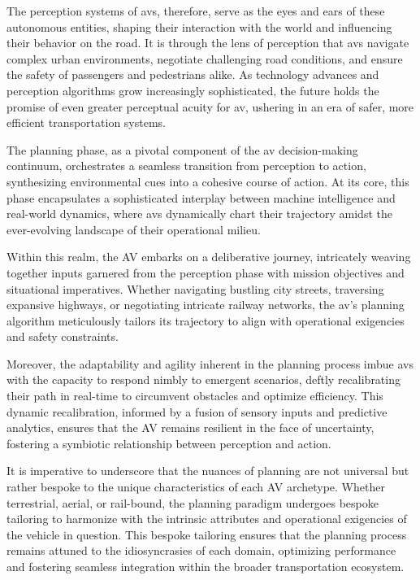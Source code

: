 The perception systems of \glspl{av}, therefore, serve as the eyes and ears of these autonomous entities, shaping their interaction with the world and influencing their behavior on the road. It is through the lens of perception that \glspl{av} navigate complex urban environments, negotiate challenging road conditions, and ensure the safety of passengers and pedestrians alike. As technology advances and perception algorithms grow increasingly sophisticated, the future holds the promise of even greater perceptual acuity for \gls{av}, ushering in an era of safer, more efficient transportation systems.

The planning phase, as a pivotal component of the \gls{av} decision-making continuum, orchestrates a seamless transition from perception to action, synthesizing environmental cues into a cohesive course of action. At its core, this phase encapsulates a sophisticated interplay between machine intelligence and real-world dynamics, where \glspl{av} dynamically chart their trajectory amidst the ever-evolving landscape of their operational milieu.

Within this realm, the AV embarks on a deliberative journey, intricately weaving together inputs garnered from the perception phase with mission objectives and situational imperatives. Whether navigating bustling city streets, traversing expansive highways, or negotiating intricate railway networks, the \gls{av}'s planning algorithm meticulously tailors its trajectory to align with operational exigencies and safety constraints.

Moreover, the adaptability and agility inherent in the planning process imbue \glspl{av} with the capacity to respond nimbly to emergent scenarios, deftly recalibrating their path in real-time to circumvent obstacles and optimize efficiency. This dynamic recalibration, informed by a fusion of sensory inputs and predictive analytics, ensures that the AV remains resilient in the face of uncertainty, fostering a symbiotic relationship between perception and action.

It is imperative to underscore that the nuances of planning are not universal but rather bespoke to the unique characteristics of each AV archetype. Whether terrestrial, aerial, or rail-bound, the planning paradigm undergoes bespoke tailoring to harmonize with the intrinsic attributes and operational exigencies of the vehicle in question. This bespoke tailoring ensures that the planning process remains attuned to the idiosyncrasies of each domain, optimizing performance and fostering seamless integration within the broader transportation ecosystem.

